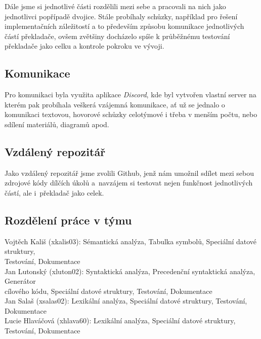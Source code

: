 \documentclass[a4paper, 11pt]{article}
\begin{document}
	Dále jsme si jednotlivé části rozdělili mezi sebe a pracovali na nich jako jednotlivci popřípadě dvojice. Stále probíhaly schůzky, například pro řešení 
	implementačních záležitostí a to především způsobu komunikace jednotlivých částí překladače, ovšem zvětšiny docházelo spíše k průběžnému testování 
	překladače jako celku a kontrole pokroku ve vývoji.
	\subsection{Komunikace}
	Pro komunikaci byla využita aplikace \textit{Discord}, kde byl vytvořen vlastní server na kterém pak probíhala veškerá vzájemná komunikace, ať už se 
	jednalo o komunikaci textovou, hovorové schůzky celotýmové i třeba v menším počtu, nebo sdílení materiálů, diagramů apod. 
	\subsection{Vzdálený repozitář}
	Jako vzdálený repozitář jsme zvolili Github, jenž nám umožnil sdílet mezi sebou zdrojové kódy dílčích úkolů a~navzájem si testovat nejen funkčnost 
	jednotlivých částí, ale i~překladač jako celek.
	\subsection{Rozdělení práce v týmu}
		\hspace*{0.25cm}	Vojtěch Kališ (xkalis03): \hspace{0.2cm} Sémantická analýza, Tabulka symbolů, Speciální datové struktury,\\
		\hspace*{5.08cm} Testování, Dokumentace\\
		\hspace*{0.8cm} 	Jan Lutonský (xluton02): \hspace{0.2cm} Syntaktická analýza, Precedenční syntaktická analýza, Generátor\\
		\hspace*{5.08cm} cílového kódu, Speciální datové struktury, Testování, Dokumentace\\
		\hspace*{1.5cm}	Jan Salaš (xsalas02): \hspace{0.2cm} Lexikální analýza, Speciální datové struktury, Testování, Dokumentace\\
		\hspace*{0.25cm}	Lucie Hlaváčová (xhlava60): \hspace{0.2cm} Lexikální analýza, Speciální datové struktury, Testování, Dokumentace\\
\end{document}
